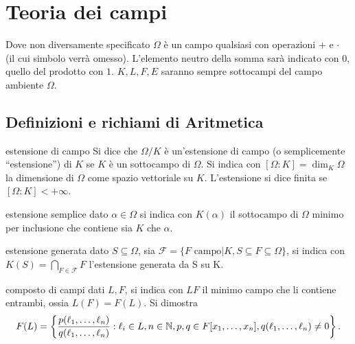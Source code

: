 \section{Teoria dei campi}
Dove non diversamente specificato $\Omega$ è un campo qualsiasi con operazioni $+$ e $\cdot$ (il cui simbolo verrà omesso). L'elemento neutro della somma sarà indicato con $0$, quello del prodotto con $1$. $K,L,F,E$ saranno sempre sottocampi del campo ambiente $\Omega$. 

\subsection{Definizioni e richiami di Aritmetica}
\begin{definition}{estensione di campo}
    Si dice che $\Omega/K$ è un'estensione di campo (o semplicemente ``estensione'') di $K$ se $K$ è un sottocampo di $\Omega$. Si indica con $[\Omega : K] = \dim_K \Omega$ la dimensione di $\Omega$ come spazio vettoriale su $K$. L'estensione si dice finita se $[\Omega : K] < +\infty$.
\end{definition}
\begin{definition}{estensione semplice}
    dato $\alpha \in \Omega$ si indica con $K(\alpha)$ il sottocampo di $\Omega$ minimo per inclusione che contiene sia $K$ che $\alpha$.
\end{definition}
\begin{definition}{estensione generata}
    dato $S\subseteq \Omega$, sia $\mathscr{F}=\{F\text{ campo}|K,S\subseteq F\subseteq \Omega\}$, si indica con $K(S) = \bigcap_{F\in\mathscr F} F$ l'estensione generata da S su K.
\end{definition}
\begin{definition}{composto di campi}
    dati $L,F$, si indica con $LF$ il minimo campo che li contiene entrambi, ossia $L(F) = F(L)$. Si dimostra
    \[
        F(L) = \left\{ \frac{p(\ell_1, \dots, \ell_n)}{q(\ell_1, \dots, \ell_n)} : \ell_i \in L, n \in \mathbb{N}, p,q \in F[x_1, \dots, x_n], q(\ell_1, \dots, \ell_n) \neq 0 \right\}.
    \]
\end{definition}

